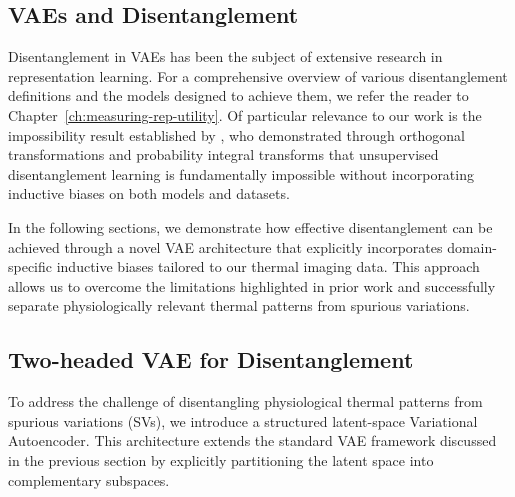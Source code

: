 \subsection{VAEs and Disentanglement}

Disentanglement in VAEs has been the subject of extensive research in representation learning. For a comprehensive overview of various disentanglement definitions and the models designed to achieve them, we refer the reader to Chapter~\ref{ch:measuring-rep-utility}. Of particular relevance to our work is the impossibility result established by \citet{locatello2019challenging}, who demonstrated through orthogonal transformations and probability integral transforms that unsupervised disentanglement learning is fundamentally impossible without incorporating inductive biases on both models and datasets.

In the following sections, we demonstrate how effective disentanglement can be achieved through a novel VAE architecture that explicitly incorporates domain-specific inductive biases tailored to our thermal imaging data. This approach allows us to overcome the limitations highlighted in prior work and successfully separate physiologically relevant thermal patterns from spurious variations.

\subsection{Two-headed VAE for Disentanglement}

To address the challenge of disentangling physiological thermal patterns from spurious variations (SVs), we introduce a structured latent-space Variational Autoencoder. This architecture extends the standard VAE framework discussed in the previous section by explicitly partitioning the latent space into complementary subspaces.

